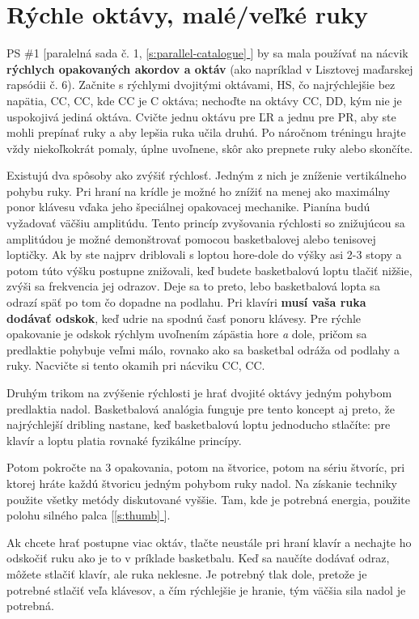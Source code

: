 \documentclass[11pt,a4paper]{book}
\newcommand*{\fullref}[1]{\hyperref[{#1}]{\ref*{#1} \nameref*{#1}}} %
\newcommand*{\fullrefp}[1]{[\fullref{#1}]} %
\begin{document}
\section{Rýchle oktávy, malé/veľké ruky}\label{s:fast-octaves}
PS \#1 [paralelná sada č. 1, \fullref{s:parallel-catalogue}] by sa mala používať na nácvik \textbf{rýchlych opakovaných akordov a oktáv} (ako napríklad v Lisztovej maďarskej rapsódii č. 6). Začnite s rýchlymi dvojitými oktávami, HS, čo najrýchlejšie bez napätia, CC, CC, kde CC je C oktáva; nechoďte na oktávy CC, DD, kým nie je uspokojivá jediná oktáva. Cvičte jednu oktávu pre ĽR a jednu pre PR, aby ste mohli prepínať ruky a aby lepšia ruka učila druhú. Po náročnom tréningu hrajte vždy niekoľkokrát pomaly, úplne uvoľnene, skôr ako prepnete ruky alebo skončíte.    

Existujú dva spôsoby ako zvýšiť rýchlosť. Jedným z nich je zníženie vertikálneho pohybu ruky. Pri hraní na krídle je možné ho znížiť na menej ako maximálny ponor klávesu vďaka jeho špeciálnej opakovacej mechanike. Pianína budú vyžadovať väčšiu amplitúdu. Tento princíp zvyšovania rýchlosti so znižujúcou sa amplitúdou je možné demonštrovať pomocou basketbalovej alebo tenisovej loptičky. Ak by ste najprv driblovali s loptou hore-dole do výšky asi 2-3 stopy a potom túto výšku postupne znižovali, keď budete basketbalovú loptu tlačiť nižšie, zvýši sa frekvencia jej odrazov. Deje sa to preto, lebo basketbalová lopta sa odrazí späť po tom čo dopadne na podlahu. Pri klavíri \textbf{musí vaša ruka dodávať odskok}, keď udrie na spodnú časť ponoru klávesy. Pre rýchle opakovanie je odskok rýchlym uvoľnením zápästia hore \textit{a} dole, pričom sa predlaktie pohybuje veľmi málo, rovnako ako sa basketbal odráža od podlahy a ruky. Nacvičte si tento okamih pri nácviku CC, CC.        

Druhým trikom na zvýšenie rýchlosti je hrať dvojité oktávy jedným pohybom predlaktia nadol. Basketbalová analógia funguje pre tento koncept aj preto, že najrýchlejší dribling nastane, keď basketbalovú loptu jednoducho stlačíte: pre klavír a loptu platia rovnaké fyzikálne princípy. 

Potom pokročte na 3 opakovania, potom na štvorice, potom na sériu štvoríc, pri ktorej hráte každú štvoricu jedným pohybom ruky nadol. Na získanie techniky použite všetky metódy diskutované vyššie. Tam, kde je potrebná energia, použite polohu silného palca \fullrefp{s:thumb}.

Ak chcete hrať postupne viac oktáv, tlačte neustále pri hraní klavír a nechajte ho odskočiť ruku ako je to v príklade basketbalu. Keď sa naučíte dodávať odraz, môžete stlačiť klavír, ale ruka neklesne. Je potrebný tlak dole, pretože je potrebné stlačiť veľa klávesov, a čím rýchlejšie je hranie, tým väčšia sila nadol je potrebná.
\end{document}
